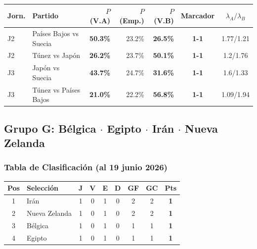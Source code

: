 \documentclass[11pt,a4paper]{article}
\newcommand{\prob}[1]{\textbf{#1\%}}
\begin{document}
\begin{center}
\begin{tabular}{@{}llrrrcc@{}}
\toprule
\textbf{Jorn.} & \textbf{Partido} & \textbf{$P$(V.A)} & \textbf{$P$(Emp.)} & \textbf{$P$(V.B)} & \textbf{Marcador} & \textbf{$\lambda_A/\lambda_B$} \\
\midrule
  J2 & Países Bajos vs Suecia & \cellcolor{yellow!30}\prob{50.3} & 23.2\% & \cellcolor{red!15}\prob{26.5} & \textbf{1-1} & 1.77/1.21 \\
  J2 & Túnez vs Japón & \cellcolor{red!15}\prob{26.2} & 23.7\% & \cellcolor{yellow!30}\prob{50.1} & \textbf{1-1} & 1.2/1.76 \\
  J3 & Japón vs Suecia & \cellcolor{red!15}\prob{43.7} & 24.7\% & \cellcolor{red!15}\prob{31.6} & \textbf{1-1} & 1.6/1.33 \\
  J3 & Túnez vs Países Bajos & \cellcolor{red!15}\prob{21.0} & 22.2\% & \cellcolor{yellow!30}\prob{56.8} & \textbf{1-1} & 1.09/1.94 \\
\bottomrule
\end{tabular}
\end{center}


\subsection{Grupo G: Bélgica $\cdot$ Egipto $\cdot$ Irán $\cdot$ Nueva Zelanda}

\subsubsection*{Tabla de Clasificación (al 19 junio 2026)}


\begin{center}
\begin{tabular}{@{}clccccccc@{}}
\toprule
\textbf{Pos} & \textbf{Selección} & \textbf{J} & \textbf{V} & \textbf{E} & \textbf{D} & \textbf{GF} & \textbf{GC} & \textbf{Pts} \\
\midrule
  \cellcolor{green!25}1 & \cellcolor{green!25}Irán & 1 & 0 & 1 & 0 & 2 & 2 & \textbf{1} \\
  \cellcolor{green!25}2 & \cellcolor{green!25}Nueva Zelanda & 1 & 0 & 1 & 0 & 2 & 2 & \textbf{1} \\
  \cellcolor{yellow!20}3 & \cellcolor{yellow!20}Bélgica & 1 & 0 & 1 & 0 & 1 & 1 & \textbf{1} \\
  4 & Egipto & 1 & 0 & 1 & 0 & 1 & 1 & \textbf{1} \\
\bottomrule
\end{tabular}
\end{center}
\end{document}
